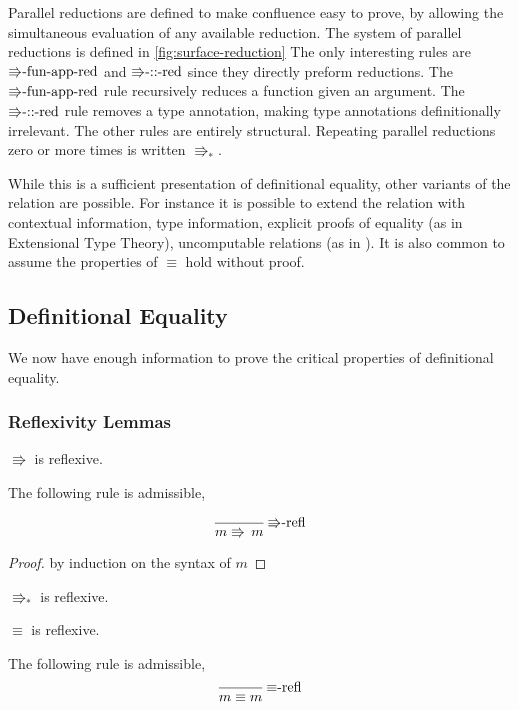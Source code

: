 Parallel reductions are defined to make confluence easy to prove, by allowing the simultaneous evaluation of any available reduction.
The system of parallel reductions is defined in \ref{fig:surface-reduction} The only interesting rules are $\textrm{\ensuremath{\Rrightarrow}-fun-app-red}$ and $\textrm{\ensuremath{\Rrightarrow}-::-red}$ since they directly preform reductions.
The $\textrm{\ensuremath{\Rrightarrow}-fun-app-red}$ rule recursively reduces a function given an argument.
The $\textrm{\ensuremath{\Rrightarrow}-::-red}$ rule removes a type annotation, making type annotations definitionally irrelevant.
The other rules are entirely structural.
Repeating parallel reductions zero or more times is written $\Rrightarrow_{\ast}$.

While this is a sufficient presentation of definitional equality, other variants of the relation are possible.
For instance it is possible to extend the relation with contextual information, type information, explicit proofs of equality (as in Extensional Type Theory), uncomputable relations (as in \cite{jia2010dependent}).
It is also common to assume the properties of $\equiv$ hold without proof.

\subsection{Definitional Equality}

We now have enough information to prove the critical properties of definitional equality.

\subsubsection{Reflexivity Lemmas}
\begin{lem}
$\Rrightarrow$ is reflexive.

The following rule is admissible,

\[
\frac{\,}{m\Rrightarrow\,m}\,\textrm{\ensuremath{\Rrightarrow}-refl}
\]
\end{lem}

\begin{proof}
by induction on the syntax of $m$
\end{proof}
\begin{fact}
$\Rrightarrow_{\ast}$ is reflexive.
\end{fact}

\begin{lem}
$\equiv$ is reflexive.

The following rule is admissible,
\[
\frac{\,}{m\equiv m}\,\textrm{\ensuremath{\equiv}-refl}
\]
\end{lem}

